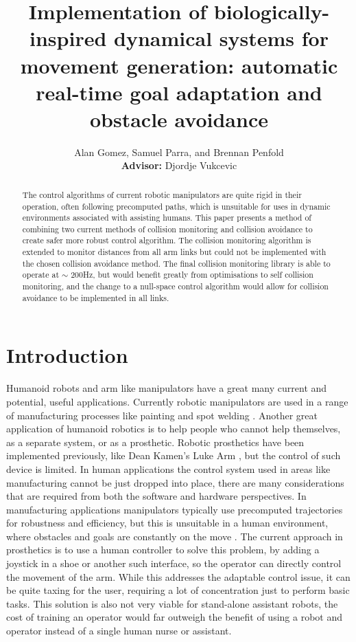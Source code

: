 \documentclass[a4paper, 10pt, conference]{ieeeconf}      %
\title{\LARGE \bf Implementation of biologically-inspired dynamical systems for movement generation: automatic real-time goal adaptation and obstacle avoidance}
\author{Alan Gomez, Samuel Parra, and Brennan Penfold \\ {\small \textbf{Advisor:} Djordje Vukcevic}}
\begin{document}
\maketitle
\thispagestyle{empty}
\pagestyle{empty}


\begin{abstract}
The control algorithms of current robotic manipulators are quite rigid in their operation, often following precomputed paths, which is unsuitable for uses in dynamic environments associated with assisting humans. This paper presents a method of combining two current methods of collision monitoring \cite{Khatib} and collision avoidance \cite{Hoffmann} to create safer more robust control algorithm. The collision monitoring algorithm is extended to monitor distances from all arm links but could not be implemented with the chosen collision avoidance method. The final collision monitoring library is able to operate at $\sim$ 200Hz, but would benefit greatly from optimisations to self collision monitoring, and the change to a null-space control algorithm would allow for collision avoidance to be implemented in all links.


\end{abstract}


\section{Introduction} %

Humanoid robots and arm like manipulators have a great many current and potential, useful applications. Currently robotic manipulators are used in a range of manufacturing processes like painting and spot welding \cite{Fadalil}. Another great application of humanoid robotics is to help people who cannot help themselves, as a separate system, or as a prosthetic. Robotic prosthetics have been implemented previously, like Dean Kamen's Luke Arm \cite{Adee}, but the control of such device is limited. In human applications the control system used in areas like manufacturing cannot be just dropped into place, there are many considerations that are required from both the software and hardware perspectives. In manufacturing applications manipulators typically use precomputed trajectories for robustness and efficiency, but this is unsuitable in a human environment, where obstacles and goals are constantly on the move \cite{Hoffmann}. The current approach in prosthetics is to use a human controller to solve this problem, by adding a joystick in a shoe \cite{Adee} or another such interface, so the operator can directly control the movement of the arm. While this addresses the adaptable control issue, it can be quite taxing for the user, requiring a lot of concentration just to perform basic tasks. This solution is also not very viable for stand-alone assistant robots, the cost of training an operator would far outweigh the benefit of using a robot and operator instead of a single human nurse or assistant. \\
\end{document}
